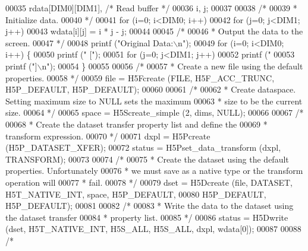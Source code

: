 \begin{DoxyCode}
00035                     rdata[DIM0][DIM1],          \textcolor{comment}{/* Read buffer */}
00036                     i, j;
00037 
00038     \textcolor{comment}{/*}
00039 \textcolor{comment}{     * Initialize data.}
00040 \textcolor{comment}{     */}
00041     \textcolor{keywordflow}{for} (i=0; i<DIM0; i++)
00042         \textcolor{keywordflow}{for} (j=0; j<DIM1; j++)
00043             wdata[i][j] = i * j - j;
00044 
00045     \textcolor{comment}{/*}
00046 \textcolor{comment}{     * Output the data to the screen.}
00047 \textcolor{comment}{     */}
00048     printf (\textcolor{stringliteral}{"Original Data:\(\backslash\)n"});
00049     \textcolor{keywordflow}{for} (i=0; i<DIM0; i++) \{
00050         printf (\textcolor{stringliteral}{" ["});
00051         \textcolor{keywordflow}{for} (j=0; j<DIM1; j++)
00052             printf (\textcolor{stringliteral}{" %
00053         printf (\textcolor{stringliteral}{"]\(\backslash\)n"});
00054     \}
00055 
00056     \textcolor{comment}{/*}
00057 \textcolor{comment}{     * Create a new file using the default properties.}
00058 \textcolor{comment}{     */}
00059     file = H5Fcreate (FILE, H5F\_ACC\_TRUNC, H5P\_DEFAULT, H5P\_DEFAULT);
00060 
00061     \textcolor{comment}{/*}
00062 \textcolor{comment}{     * Create dataspace.  Setting maximum size to NULL sets the maximum}
00063 \textcolor{comment}{     * size to be the current size.}
00064 \textcolor{comment}{     */}
00065     space = H5Screate\_simple (2, dims, NULL);
00066 
00067     \textcolor{comment}{/*}
00068 \textcolor{comment}{     * Create the dataset transfer property list and define the}
00069 \textcolor{comment}{     * transform expression.}
00070 \textcolor{comment}{     */}
00071     dxpl = H5Pcreate (H5P\_DATASET\_XFER);
00072     status = H5Pset\_data\_transform (dxpl, TRANSFORM);
00073 
00074     \textcolor{comment}{/*}
00075 \textcolor{comment}{     * Create the dataset using the default properties.  Unfortunately}
00076 \textcolor{comment}{     * we must save as a native type or the transform operation will}
00077 \textcolor{comment}{     * fail.}
00078 \textcolor{comment}{     */}
00079     dset = H5Dcreate (file, DATASET, H5T\_NATIVE\_INT, space, H5P\_DEFAULT,
00080                 H5P\_DEFAULT, H5P\_DEFAULT);
00081 
00082     \textcolor{comment}{/*}
00083 \textcolor{comment}{     * Write the data to the dataset using the dataset transfer}
00084 \textcolor{comment}{     * property list.}
00085 \textcolor{comment}{     */}
00086     status = H5Dwrite (dset, H5T\_NATIVE\_INT, H5S\_ALL, H5S\_ALL, dxpl, wdata[0]);
00087 
00088     \textcolor{comment}{/*}
}
\end{DoxyCode}
